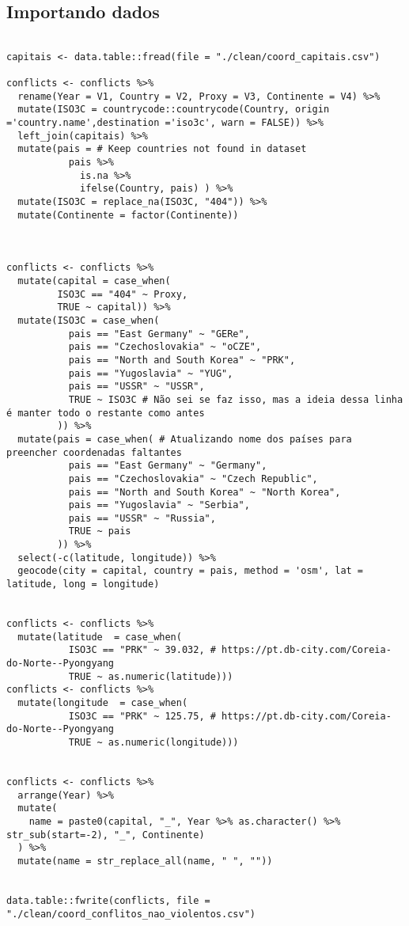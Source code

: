 \documentclass[11pt]{article}
\begin{document}
\subsection*{Importando dados}
\label{sec:org4e72193}

\begin{verbatim}

capitais <- data.table::fread(file = "./clean/coord_capitais.csv")

conflicts <- conflicts %>%
  rename(Year = V1, Country = V2, Proxy = V3, Continente = V4) %>%
  mutate(ISO3C = countrycode::countrycode(Country, origin ='country.name',destination ='iso3c', warn = FALSE)) %>%
  left_join(capitais) %>%
  mutate(pais = # Keep countries not found in dataset
           pais %>%
             is.na %>%
             ifelse(Country, pais) ) %>%
  mutate(ISO3C = replace_na(ISO3C, "404")) %>%
  mutate(Continente = factor(Continente))



conflicts <- conflicts %>%
  mutate(capital = case_when(
         ISO3C == "404" ~ Proxy,
         TRUE ~ capital)) %>%
  mutate(ISO3C = case_when(
           pais == "East Germany" ~ "GERe",
           pais == "Czechoslovakia" ~ "oCZE",
           pais == "North and South Korea" ~ "PRK",
           pais == "Yugoslavia" ~ "YUG",
           pais == "USSR" ~ "USSR",
           TRUE ~ ISO3C # Não sei se faz isso, mas a ideia dessa linha é manter todo o restante como antes
         )) %>%
  mutate(pais = case_when( # Atualizando nome dos países para preencher coordenadas faltantes
           pais == "East Germany" ~ "Germany",
           pais == "Czechoslovakia" ~ "Czech Republic",
           pais == "North and South Korea" ~ "North Korea",
           pais == "Yugoslavia" ~ "Serbia",
           pais == "USSR" ~ "Russia",
           TRUE ~ pais
         )) %>%
  select(-c(latitude, longitude)) %>%
  geocode(city = capital, country = pais, method = 'osm', lat = latitude, long = longitude)


conflicts <- conflicts %>%
  mutate(latitude  = case_when(
           ISO3C == "PRK" ~ 39.032, # https://pt.db-city.com/Coreia-do-Norte--Pyongyang
           TRUE ~ as.numeric(latitude)))
conflicts <- conflicts %>%
  mutate(longitude  = case_when(
           ISO3C == "PRK" ~ 125.75, # https://pt.db-city.com/Coreia-do-Norte--Pyongyang
           TRUE ~ as.numeric(longitude)))


conflicts <- conflicts %>%
  arrange(Year) %>%
  mutate(
    name = paste0(capital, "_", Year %>% as.character() %>% str_sub(start=-2), "_", Continente)
  ) %>%
  mutate(name = str_replace_all(name, " ", ""))


data.table::fwrite(conflicts, file = "./clean/coord_conflitos_nao_violentos.csv")
\end{verbatim}
\end{document}
